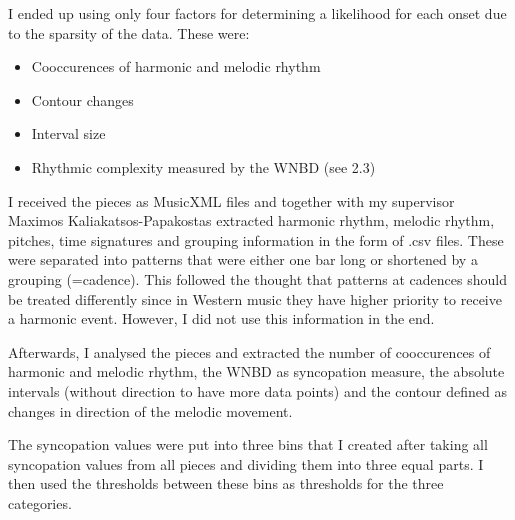\documentclass[a4paper,12pt]{report}
\begin{document}
I ended up using only four factors for determining a likelihood for each onset due to the sparsity of the data. These were:
\vspace{1ex}
\begin{itemize}
	\item{Cooccurences of harmonic and melodic rhythm}
	\item{Contour changes}
	\item{Interval size}
	\item{Rhythmic complexity measured by the WNBD (see 2.3)}
\end{itemize}
\par
\vspace{2ex}
I received the pieces as MusicXML files and together with my supervisor Maximos Kaliakatsos-Papakostas extracted harmonic rhythm, melodic rhythm, pitches, time signatures and grouping information in the form of .csv files. These were separated into patterns that were either one bar long or shortened by a grouping (=cadence). This followed the thought that patterns at cadences should be treated differently since in Western music they have higher priority to receive a harmonic event. However, I did not use this information in the end.

Afterwards, I analysed the pieces and extracted the number of cooccurences of harmonic and melodic rhythm, the WNBD as syncopation measure, the absolute intervals (without direction to have more data points) and the contour defined as changes in direction of the melodic movement.

The syncopation values were put into three bins that I created after taking all syncopation values from all pieces and dividing them into three equal parts. I then used the thresholds between these bins as thresholds for the three categories.
\end{document}
